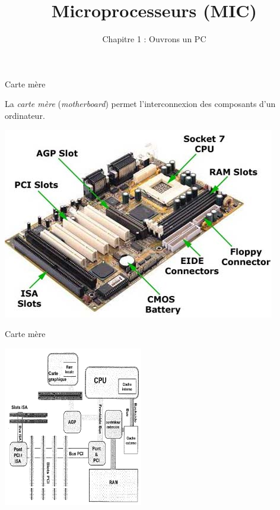 \documentclass[14pt,xcolor,table]{beamer}
\title{Microprocesseurs (MIC)}
\subtitle{Chapitre 1 : Ouvrons un PC}
\date{}
\begin{document}
\begin{frame}
	\titlepage
\end{frame}

\begin{frame}[fragile]{Carte mère}
	
	La \emph{carte mère} (\textit{motherboard})
	permet l'interconnexion des composants d'un ordinateur.
	
	\begin{center}
	\includegraphics[width=.7\textwidth]{images/motherboard}
	\end{center}
	
\end{frame}

\begin{frame}[fragile]{Carte mère}
	
	\begin{center}
	\includegraphics[height=7cm]{images/motherboard-schema}
	\end{center}
	
\end{frame}
\end{document}
